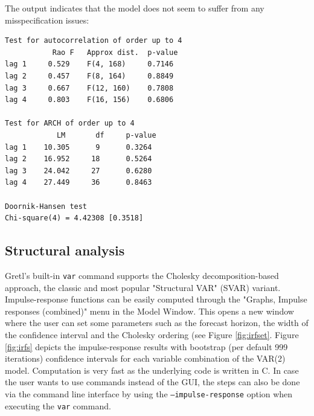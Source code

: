 \documentclass[11pt]{article}
\begin{document}
The output indicates that the model does not seem to suffer from any misspecification issues:
\begin{Verbatim}[baselinestretch=0.75, fontsize=\small]
Test for autocorrelation of order up to 4
           Rao F   Approx dist.  p-value
lag 1     0.529    F(4, 168)     0.7146
lag 2     0.457    F(8, 164)     0.8849
lag 3     0.667    F(12, 160)    0.7808
lag 4     0.803    F(16, 156)    0.6806

Test for ARCH of order up to 4
            LM       df     p-value
lag 1    10.305      9      0.3264
lag 2    16.952     18      0.5264
lag 3    24.042     27      0.6280
lag 4    27.449     36      0.8463

Doornik-Hansen test
Chi-square(4) = 4.42308 [0.3518]

\end{Verbatim}


\subsection{Structural analysis}
Gretl’s built-in \texttt{var} command supports the Cholesky decomposition-based approach, the classic and most popular "Structural VAR" (SVAR) variant. Impulse-response functions can be easily computed through the "Graphs, Impulse responses (combined)" menu in the Model Window. This opens a new window where the user can set some parameters such as the forecast horizon, the width of the confidence interval and the Cholesky ordering (see Figure \ref{fig:irfset}.
Figure \ref{fig:irfs} depicts the impulse-response results with bootstrap (per default 999 iterations) confidence intervals for each variable combination of the VAR(2) model. Computation is very fast as the underlying code is written in C. In case the user wants to use commands instead of the GUI, the steps can also be done via the command line interface by using the \texttt{---impulse-response} option when executing the \texttt{var} command.
\end{document}

